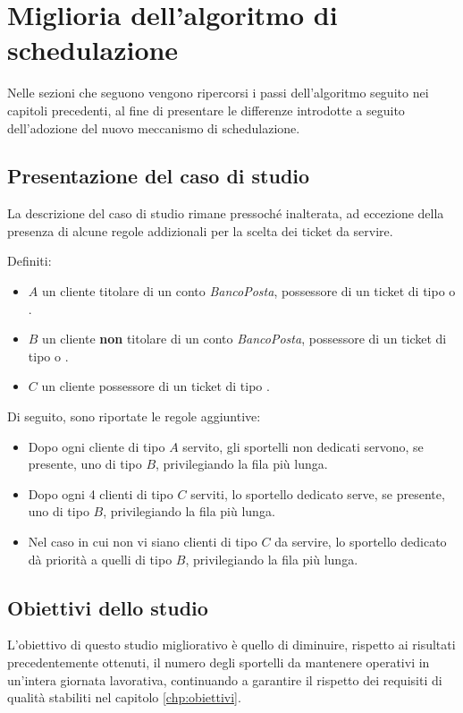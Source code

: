 \chapter{Miglioria dell'algoritmo di schedulazione}\label{chp:miglioria}
Nelle sezioni che seguono vengono ripercorsi i passi dell'algoritmo seguito nei capitoli precedenti, al fine di presentare le differenze introdotte a seguito dell'adozione del nuovo meccanismo di schedulazione.
\section{Presentazione del caso di studio}\label{sec:miglioria-presentazione}
La descrizione del caso di studio rimane pressoché inalterata, ad eccezione della presenza di alcune regole addizionali per la scelta dei ticket da servire.

Definiti:
\begin{itemize}
\item $A$ un cliente titolare di un conto \textsl{BancoPosta}, possessore di un ticket di tipo \uo{} o \pp{}.
\item $B$ un cliente \textbf{non} titolare di un conto \textsl{BancoPosta}, possessore di un ticket di tipo \uo{} o \pp{}.
\item $C$ un cliente possessore di un ticket di tipo \sr{}.
\end{itemize}
Di seguito, sono riportate le regole aggiuntive:
\begin{itemize}
\item Dopo ogni cliente di tipo $A$ servito, gli sportelli non dedicati servono, se presente, uno di tipo $B$, privilegiando la fila più lunga. 
\item Dopo ogni 4 clienti di tipo $C$ serviti, lo sportello dedicato serve, se presente, uno di tipo $B$, privilegiando la fila più lunga.
\item Nel caso in cui non vi siano clienti di tipo $C$ da servire, lo sportello dedicato dà priorità a quelli di tipo $B$, privilegiando la fila più lunga.
\end{itemize}
\section{Obiettivi dello studio}\label{sec:miglioria-obiettivi}
L'obiettivo di questo studio migliorativo è quello di diminuire, rispetto ai risultati precedentemente ottenuti, il numero degli sportelli da mantenere operativi in un'intera giornata lavorativa, continuando a garantire il rispetto dei requisiti di qualità stabiliti nel capitolo \ref{chp:obiettivi}.
